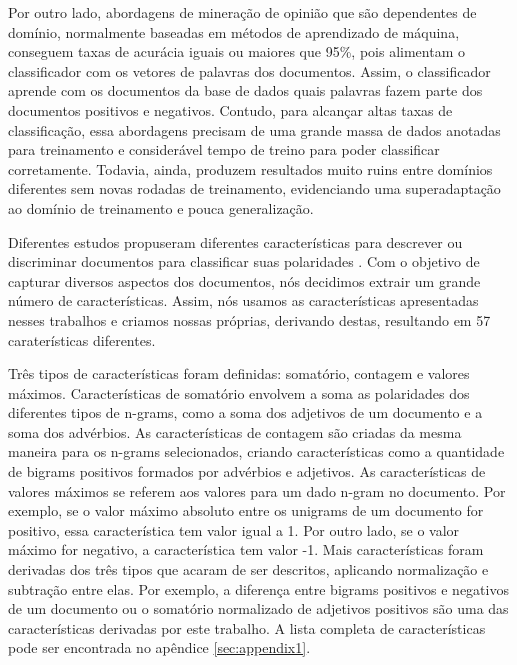 Por outro lado, abordagens de mineração de opinião que são dependentes de domínio, normalmente baseadas em métodos de aprendizado de máquina, conseguem taxas de acurácia iguais ou maiores que 95\%, pois alimentam o classificador com os vetores de palavras dos documentos. Assim, o classificador aprende com os documentos da base de dados quais palavras fazem parte dos documentos positivos e negativos. Contudo, para alcançar altas taxas de classificação, essa abordagens precisam de uma grande massa de dados anotadas para treinamento e considerável tempo de treino para poder classificar corretamente. Todavia, ainda, produzem resultados muito ruins entre domínios diferentes sem novas rodadas de treinamento, evidenciando uma superadaptação ao domínio de treinamento e pouca generalização.

Diferentes estudos propuseram diferentes características para descrever ou discriminar documentos para classificar suas polaridades \cite{wilson2005recognizing, ohana2009sentiment, taboada2011lexicon}. Com o objetivo de capturar diversos aspectos dos documentos, nós decidimos extrair um grande número de características. Assim, nós usamos as características apresentadas nesses trabalhos e criamos nossas próprias, derivando destas, resultando em 57 caraterísticas diferentes.

Três tipos de características foram definidas: somatório, contagem e valores máximos. Características de somatório envolvem a soma as polaridades dos diferentes tipos de n-grams, como a soma dos adjetivos de um documento e a soma dos advérbios. As características de contagem são criadas da mesma maneira para os n-grams selecionados, criando características como a quantidade de bigrams positivos formados por advérbios e adjetivos. As características de valores máximos se referem aos valores para um dado n-gram no documento. Por exemplo, se o valor máximo absoluto entre os unigrams de um documento for positivo, essa característica tem valor igual a 1. Por outro lado, se o valor máximo for negativo, a característica tem valor -1. Mais características foram derivadas dos três tipos que acaram de ser descritos, aplicando normalização e subtração entre elas. Por exemplo, a diferença entre bigrams positivos e negativos de um documento ou o somatório normalizado de adjetivos positivos são uma das características derivadas por este trabalho. A lista completa de características pode ser encontrada no apêndice \ref{sec:appendix1}.

